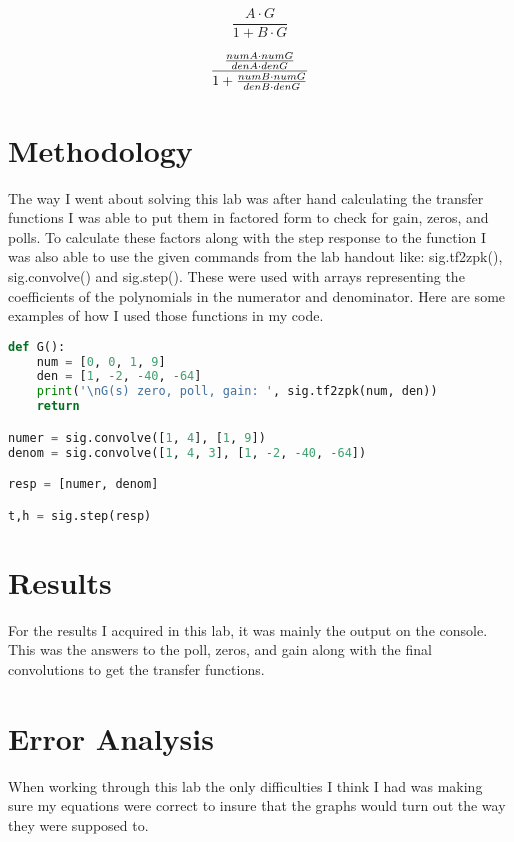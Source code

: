 \documentclass[12pt]{report}
\begin{document}
\begin{equation*}
\frac{A \cdot G}{1 + B \cdot G}
\end{equation*}

\begin{equation*}\large
\frac{\frac{numA \cdot numG}{denA \cdot denG}}{1 + \frac{numB \cdot numG}{denB \cdot denG}}
\end{equation*}

\section{Methodology}

The way I went about solving this lab was after hand calculating the transfer functions I was able to put them in factored form to check for gain, zeros, and polls. To calculate these factors along with the step response to the function I was also able to use the given commands from the lab handout like: sig.tf2zpk(), sig.convolve() and sig.step(). These were used with arrays representing the coefficients of the polynomials in the numerator and denominator. Here are some examples of how I used those functions in my code.
\begin{lstlisting}[language=Python]
def G():
    num = [0, 0, 1, 9]
    den = [1, -2, -40, -64]
    print('\nG(s) zero, poll, gain: ', sig.tf2zpk(num, den))
    return 

numer = sig.convolve([1, 4], [1, 9])
denom = sig.convolve([1, 4, 3], [1, -2, -40, -64])

resp = [numer, denom]

t,h = sig.step(resp)

\end{lstlisting}

\section{Results}

For the results I acquired in this lab, it was mainly the output on the console. This was the answers to the poll, zeros, and gain along with the final convolutions to get the transfer functions. 

\section{Error Analysis}

When working through this lab the only difficulties I think I had was making sure my equations were correct to insure that the graphs would turn out the way they were supposed to.
\end{document}
